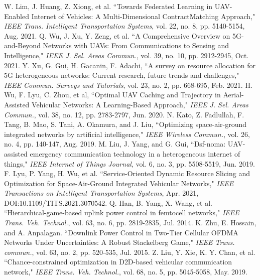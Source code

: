 \documentclass[openany]{YSUthesis}
\begin{document}
%  
\begin{thebibliography}{0}   %
W. Lim, J. Huang, Z. Xiong, et al. ``Towards Federated Learning in UAV-Enabled Internet of Vehicles: A Multi-Dimensional ContractMatching Approach," \emph{IEEE Trans. Intelligent Transportation Systems}, vol. 22, no. 8, pp. 5140-5154, Aug. 2021.
Q. Wu, J. Xu, Y. Zeng, et al. ``A Comprehensive Overview on 5G-and-Beyond Networks with UAVs: From Communications to Sensing and Intelligence," \emph{IEEE J. Sel. Areas Commun.}, vol. 39, no. 10, pp. 2912-2945, Oct. 2021.
Y. Xu, G. Gui, H. Gacanin, F. Adachi, ``A survey on resource allocation for 5G heterogeneous networks: Current research, future trends and challenges," \emph{IEEE Commun. Surveys and Tutorials}, vol. 23, no. 2, pp. 668-695, Feb. 2021.
H. Wu, F. Lyu, C. Zhou, et al, ``Optimal UAV Caching and Trajectory in Aerial-Assisted Vehicular Networks: A Learning-Based Approach," \emph{IEEE J. Sel. Areas Commun.}, vol. 38, no. 12, pp.  2783-2797, Jun. 2020.
N. Kato, Z. Fadlullah, F. Tang, B. Mao, S. Tani, A. Okamura, and J. Liu, ``Optimizing space-air-ground integrated networks by artificial intelligence," \emph{IEEE Wireless Commun.}, vol. 26, no. 4, pp. 140-147, Aug. 2019.
M. Liu, J. Yang, and G. Gui, ``Dsf-noma: UAV-assisted emergency communication technology in a heterogeneous internet of things," \emph{IEEE Internet of Things Journal}, vol. 6, no. 3, pp. 5508-5519, Jun. 2019.
F. Lyu, P. Yang, H. Wu, et al. ``Service-Oriented Dynamic Resource Slicing and Optimization for Space-Air-Ground Integrated Vehicular Networks," \emph{IEEE Transactions on Intelligent Transportation Systems}, Apr. 2021, DOI:10.1109/TITS.2021.3070542.
Q. Han, B. Yang, X. Wang, et al. ``Hierarchical-game-based uplink power control in femtocell networks," \emph{IEEE Trans. Veh. Technol.}, vol. 63, no. 6, pp. 2819-2835, Jul. 2014.
K. Zhu, E. Hossain, and A. Anpalagan. ``Downlink Power Control in Two-Tier Cellular OFDMA Networks Under Uncertainties: A Robust Stackelberg Game," \emph{IEEE Trans. commun.}, vol. 63, no. 2, pp. 520-535, Jul. 2015.
Z. Liu, Y. Xie, K. Y. Chan, et al. ``Chance-constrained optimization in D2D-based vehicular communication network," \emph{IEEE Trans. Veh. Technol.}, vol. 68, no. 5, pp. 5045-5058, May. 2019.

\end{thebibliography}
\end{document}

